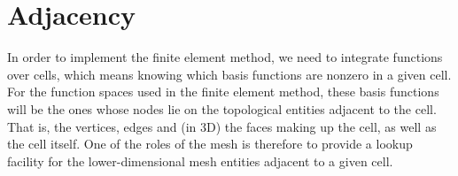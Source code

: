 \documentclass{book}
\begin{document}
\section{Adjacency}
\label{\detokenize{3_meshes:secadjacency}}\label{\detokenize{3_meshes:adjacency}}
In order to implement the finite element method, we need to integrate
functions over cells, which means knowing which basis functions are
nonzero in a given cell. For the function spaces used in the finite
element method, these basis functions will be the ones whose nodes lie
on the topological entities adjacent to the cell. That is, the
vertices, edges and (in 3D) the faces making up the cell, as well as
the cell itself. One of the roles of the mesh is therefore to provide
a lookup facility for the lower-dimensional mesh entities adjacent to
a given cell.
\end{document}
